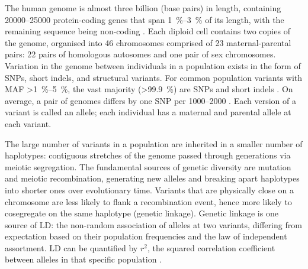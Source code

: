 \begin{outline}
The human genome is almost three billion \si{\bp} (base pairs) in length, 
containing \numrange{20000}{25000} protein-coding genes that span \SIrange{1}{3}{\percent} of its length, with the remaining sequence being non-coding \autocite{theencodeprojectconsortium2012IntegratedEncyclopediaDNA,1000genomesprojectconsortium2015GlobalReferenceHuman}.
Each diploid cell contains two copies of the genome, organised into 46 chromosomes comprised of 23 maternal-parental pairs: 22 pairs of homologous autosomes and one pair of sex chromosomes.
Variation in the genome between individuals in a population exists in the form of \glspl{SNP}, short indels, and structural variants.
For common population variants with \gls{MAF} \SIrange{>1}{5}{\percent},
the vast majority (\SI{>99.9}{\percent}) are \glspl{SNP} and short indels \autocite{1000genomesprojectconsortium2015GlobalReferenceHuman}.
On average, a pair of genomes differs by one \gls{SNP} per \SIrange{1000}{2000}{\bp} \autocite{theinternationalsnpmapworkinggroup2001MapHumanGenome}.
Each version of a variant is called an allele; each individual has a maternal and parental allele at each variant.

The large number of variants in a population are inherited in a smaller number of haplotypes: 
contiguous stretches of the genome passed through generations via meiotic segregation.
The fundamental sources of genetic diversity are mutation and meiotic recombination, generating new alleles and breaking apart haplotypes into shorter ones over evolutionary time.
Variants that are physically close on a chromosome are less likely to flank a recombination event, hence more likely to cosegregate on the same haplotype (genetic linkage).
Genetic linkage is one source of \gls{LD}: the non-random association of alleles at two variants, differing from expectation based on their population frequencies and the law of independent assortment.
\gls{LD} can be quantified by $r^2$, the squared correlation coefficient between alleles in that specific population \autocite{slatkin2008LinkageDisequilibriumUnderstanding}.


\end{outline}
